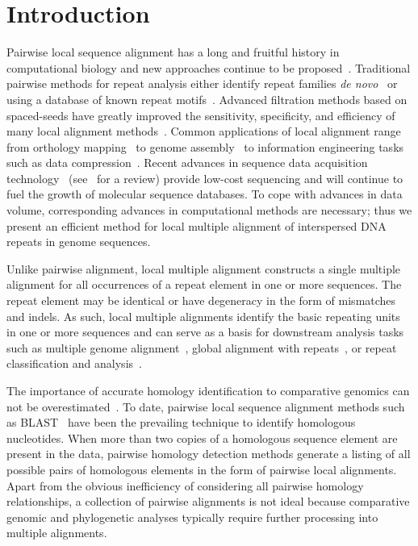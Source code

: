 \documentclass[12pt,journal,letterpaper,onecolumn, draftcls]{IEEEtran}
\begin{document}
\section{Introduction}
Pairwise local sequence alignment has a long and fruitful history in computational biology and new approaches continue to be proposed~\cite{ref-pattern,ref-chaos,ref-yass,ref-kahveciMAP}. Traditional pairwise methods for repeat analysis either identify repeat families \textit{de novo}~\cite{ref-reputer} or using a database of known repeat motifs~\cite{ref-repbase}. Advanced filtration methods based on spaced-seeds have greatly improved the sensitivity, specificity, and efficiency of many local alignment methods~\cite{ref-zhang04,ref-zhang06,ref-buhler05,ref-xu04,ref-batzoglouNAR, ref-rasmussen}. Common applications of local alignment range from orthology mapping~\cite{ref-orthomcl} to genome assembly~\cite{ref-arachne2} to information engineering tasks such as data compression~\cite{ref-ane}. Recent advances in sequence data acquisition technology~\cite{ref-454, sequencing, hybrid} (see~\cite{ref-nextgenseq} for a review) provide low-cost sequencing and will continue to fuel the growth of molecular sequence databases. To cope with advances in data volume, corresponding advances in computational methods are necessary; thus we present an efficient method for local multiple alignment of interspersed DNA repeats in genome sequences.

Unlike pairwise alignment, local multiple alignment constructs a single multiple alignment for all occurrences of a repeat element in one or more sequences.  The repeat element may be identical or have degeneracy in the form of mismatches and indels.  As such, local multiple alignments identify the basic repeating units in one or
more sequences and can serve as a basis for downstream analysis tasks such as multiple genome alignment~\cite{ref-mauve,ref-mga,ref-mgcat,ref-deweyReview}, global alignment with repeats~\cite{ref-otherSammethPaper,ref-aba}, or repeat classification and analysis~\cite{ref-piler}.

The importance of accurate homology identification to comparative genomics can not be overestimated~\cite{Kumar07}. To date, pairwise local sequence alignment methods such as BLAST~\cite{ref-blastz,ref-ssearch} have been the prevailing technique to identify homologous nucleotides. When more than two copies of a homologous sequence element are present in the data, pairwise homology detection methods generate a listing of all possible pairs of homologous elements in the form of pairwise local alignments.  Apart from the obvious inefficiency of considering all pairwise homology relationships, a collection of pairwise alignments is not ideal because comparative genomic and phylogenetic analyses typically require further processing into multiple alignments.
\end{document}
